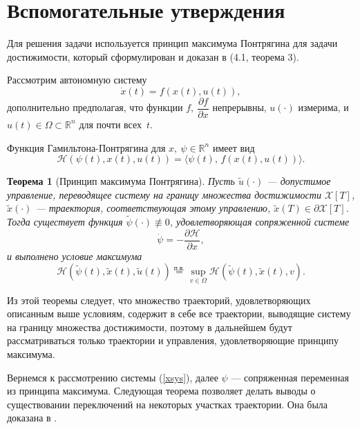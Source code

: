 \documentclass[16pt]{article}
\newtheorem{Th}{Теорема}
\newcommand\Real{\mathbb{R}}
\newcommand\A{(\cdot)}
\newcommand\Scal[2]{\langle #1,\, #2 \rangle}
\newcommand\X{\mathcal{X}}
\begin{document}
\section{Вспомогательные утверждения}
Для решения задачи используется принцип максимума Понтрягина для задачи достижимости, который сформулирован и 
доказан в \cite{LiMarkus} (4.1, теорема 3).

Рассмотрим автономную систему
$$ \dot x(t) = f(x(t), u(t)),$$
дополнительно предполагая, что функции $f, \ \dfrac{\partial f}{\partial x}$ непрерывны, $u\A$ измерима, и 
$u(t) \in \Omega \subset \Real^n$ для почти всех~$t$.

Функция Гамильтона-Понтрягина для $x,\ \psi \in \Real^n$ имеет вид
$$\mathcal{H}(\psi(t), x(t), u(t)) = \Scal{\psi(t)}{f(x(t), u(t))}.$$
\begin{Th}[Принцип максимума Понтрягина]
Пусть $\tilde u\A$ --- допустимое управление, переводящее систему на границу множества достижимости $\X[T]$,
$\tilde x\A$ --- траектория, соответствующая этому управлению, $\tilde x(T) \in \partial \X[T]$. Тогда существует
функция
$\tilde \psi\A  \not\equiv 0$, удовлетворяющая сопряженной системе
$$ \dot \psi = -\dfrac{\partial \mathcal{H}}{\partial x},$$
и выполнено условие максимума
$$\mathcal{H}(\tilde \psi(t), \tilde x(t), \tilde u(t)) \overset{\text{п.в.}}{=} \sup_{v \in \Omega} \mathcal{H}(\tilde \psi(t), \tilde x(t),v).$$
\end{Th}

Из этой теоремы следует, что множество траекторий, удовлетворяющих описанным выше условиям, содержит в себе
все траектории, выводящие систему на границу множества достижимости, поэтому в дальнейшем будут рассматриваться
только траектории и управления, удовлетворяющие принципу максимума.

Вернемся к рассмотрению системы (\ref{xsys}), далее $\psi$ --- сопряженная переменная
из принципа максимума.
Следующая теорема позволяет делать выводы о существовании переключений на некоторых участках траектории.
Она была доказана в \cite{OC}. 
\end{document}
